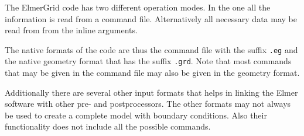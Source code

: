 The ElmerGrid code has two different operation modes.
In the one all the information is read from a command file.
Alternatively all necessary data may be read from 
from the inline arguments. 

The native formats of the code are thus the command file 
with the suffix \texttt{.eg} and the 
native geometry format that has the suffix \texttt{.grd}. 
Note that most commands that may be given in the command file 
may also be given in the geometry format. 

Additionally there are several other input formats
that helps in linking the Elmer software with other pre- and 
postprocessors. 
The other formats may
not always be used to create a complete
model with boundary conditions. Also their functionality 
does not include all the possible commands.

